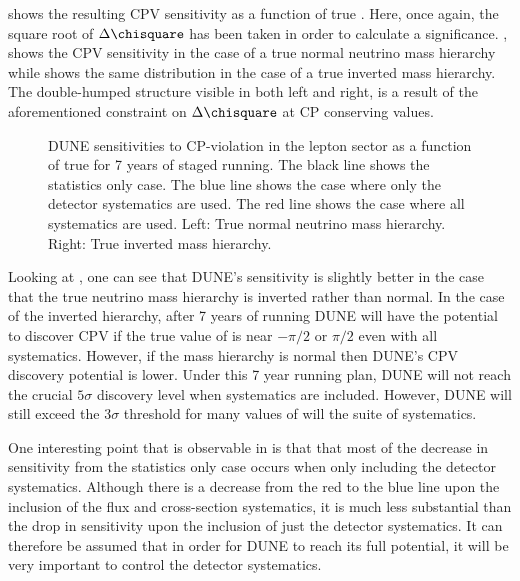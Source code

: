  shows the resulting CPV sensitivity as a function of true \dcp.
Here, once again, the square root of $\Delta\chisquare$ has been taken in order to calculate a significance.
, shows the CPV sensitivity in the case of a true normal neutrino mass hierarchy while  shows the same distribution in the case of a true inverted mass hierarchy.
The double-humped structure visible in both  left and right, is a result of the aforementioned constraint on $\Delta\chisquare$ at CP conserving values.

\begin{figure}[h]
	\begin{minipage}[t]{.5\linewidth}
		\begin{adjustbox}{max totalsize=\linewidth, center}
			
		\end{adjustbox}
	\end{minipage}
	\hfill
	\begin{minipage}[t]{.5\linewidth}
		\begin{adjustbox}{max totalsize=\linewidth, center}
			
		\end{adjustbox}
	\end{minipage}
	\caption[DUNE sensitivities to CP-violation in the lepton sector as a function of true \dcp.]{DUNE sensitivities to CP-violation in the lepton sector as a function of true \dcp for 7 years of staged running. The black line shows the statistics only case. The blue line shows the case where only the detector systematics are used. The red line shows the case where all systematics are used. Left: True normal neutrino mass hierarchy. Right: True inverted mass hierarchy.}
	\label{fig:cpvSens}
\end{figure}

Looking at , one can see that DUNE's sensitivity is slightly better in the case that the true neutrino mass hierarchy is inverted rather than normal.
In the case of the inverted hierarchy, after 7 years of running DUNE will have the potential to discover CPV if the true value of \dcp is near $-\pi/2$ or $\pi/2$ even with all systematics.
However, if the mass hierarchy is normal then DUNE's CPV discovery potential is lower. 
Under this 7 year running plan, DUNE will not reach the crucial $5\sigma$ discovery level when systematics are included. 
However, DUNE will still exceed the $3\sigma$ threshold for many values of \dcp will the suite of systematics.

One interesting point that is observable in  is that that most of the decrease in sensitivity from the statistics only case occurs when only including the detector systematics.
Although there is a decrease from the red to the blue line upon the inclusion of the flux and cross-section systematics, it is much less substantial than the drop in sensitivity upon the inclusion of just the detector systematics.
It can therefore be assumed that in order for DUNE to reach its full potential, it will be very important to control the detector systematics.
